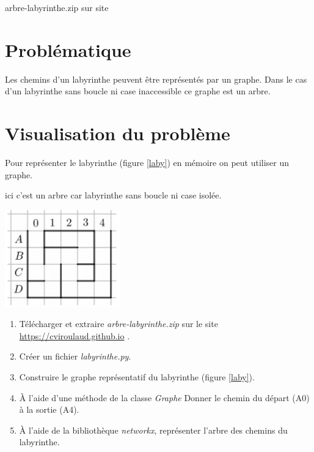 \documentclass[a4paper,11pt]{article}
\begin{document}
\begin{Form}
\begin{commentprof}
arbre-labyrinthe.zip sur site
\end{commentprof}
\section{Problématique}
Les chemins d'un labyrinthe peuvent être représentés par un graphe. Dans le cas d'un labyrinthe sans boucle ni case inaccessible ce graphe est un arbre.
\begin{center}
\end{center}
\section{Visualisation du problème}
Pour représenter le labyrinthe (figure \ref{laby}) en mémoire on peut utiliser un graphe.
\begin{commentprof}
ici c'est un arbre car labyrinthe sans boucle ni case isolée.
\end{commentprof}
\begin{center}
\centering
\includegraphics[width=5cm]{ressources/labyrinthe.png}
\label{laby}
\end{center}
\begin{activite}
\begin{enumerate}
\item Télécharger et extraire \emph{arbre-labyrinthe.zip} sur le site \url{https://cviroulaud.github.io} .
\item Créer un fichier \emph{labyrinthe.py}.
\item Construire le graphe représentatif du labyrinthe (figure \ref{laby}).
\item À l'aide d'une méthode de la classe \emph{Graphe} Donner le chemin du départ (A0) à la sortie (A4).
\item À l'aide de la bibliothèque \emph{networkx}, représenter l'arbre des chemins du labyrinthe.
\end{enumerate}
\end{activite}

\end{Form}
\end{document}

